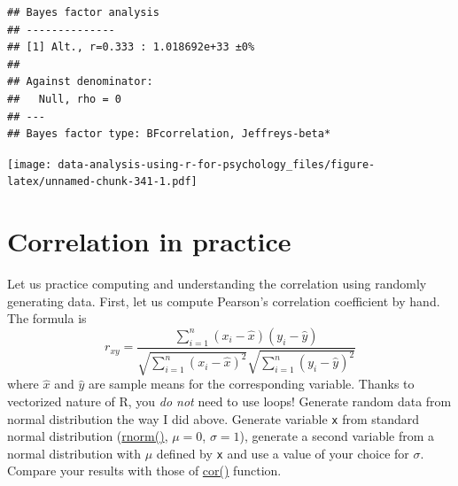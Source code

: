 \documentclass[
]{book}
\newenvironment{Shaded}{\begin{snugshade}}{\end{snugshade}}
\newcommand{\AttributeTok}[1]{\textcolor[rgb]{0.77,0.63,0.00}{#1}}
\newcommand{\ConstantTok}[1]{\textcolor[rgb]{0.00,0.00,0.00}{#1}}
\newcommand{\DecValTok}[1]{\textcolor[rgb]{0.00,0.00,0.81}{#1}}
\newcommand{\FunctionTok}[1]{\textcolor[rgb]{0.00,0.00,0.00}{#1}}
\newcommand{\NormalTok}[1]{#1}
\newcommand{\OtherTok}[1]{\textcolor[rgb]{0.56,0.35,0.01}{#1}}
\newcommand{\SpecialCharTok}[1]{\textcolor[rgb]{0.00,0.00,0.00}{#1}}
\newcommand{\StringTok}[1]{\textcolor[rgb]{0.31,0.60,0.02}{#1}}
\begin{document}
\begin{verbatim}
## Bayes factor analysis
## --------------
## [1] Alt., r=0.333 : 1.018692e+33 ±0%
## 
## Against denominator:
##   Null, rho = 0 
## ---
## Bayes factor type: BFcorrelation, Jeffreys-beta*
\end{verbatim}

\begin{Shaded}
\end{Shaded}

\texttt{[image: data-analysis-using-r-for-psychology\_files/figure-latex/unnamed-chunk-341-1.pdf]}

\hypertarget{correlation-in-practice}{%
\section{Correlation in practice}\label{correlation-in-practice}}

Let us practice computing and understanding the correlation using randomly generating data. First, let us compute Pearson's correlation coefficient by hand. The formula is
\[
r_{xy} = \frac{\sum_{i=1}^{n}(x_i-\hat{x})(y_i-\hat{y})}{\sqrt{\sum_{i=1}^{n}(x_i-\hat{x})^2}\sqrt{\sum_{i=1}^{n}(y_i-\hat{y})^2}}
\]
where \(\hat{x}\) and \(\hat{y}\) are sample means for the corresponding variable. Thanks to vectorized nature of R, you \emph{do not} need to use loops! Generate random data from normal distribution the way I did above. Generate variable \texttt{x} from standard normal distribution (\href{https://stat.ethz.ch/R-manual/R-devel/library/stats/html/Normal.html}{rnorm()}, \(\mu=0\), \(\sigma=1\)), generate a second variable from a normal distribution with \(\mu\) defined by \texttt{x} and use a value of your choice for \(\sigma\). Compare your results with those of \href{https://stat.ethz.ch/R-manual/R-devel/library/stats/html/cor.html}{cor()} function.
\end{document}
